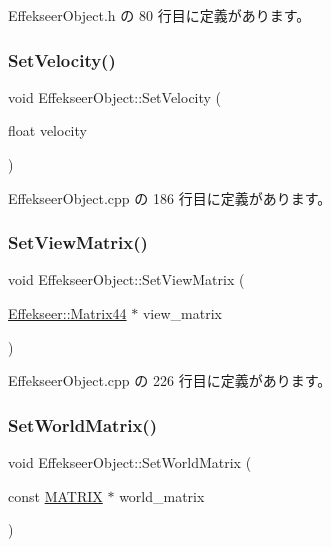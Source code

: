  Effekseer\+Object.\+h の 80 行目に定義があります。

\mbox{\label{class_effekseer_object_a3c14fd4215640b648b14e445b99564f7}} 
\subsubsection{\texorpdfstring{Set\+Velocity()}{SetVelocity()}}
{\footnotesize\ttfamily void Effekseer\+Object\+::\+Set\+Velocity (\begin{DoxyParamCaption}\item[{float}]{velocity }\end{DoxyParamCaption})}



 Effekseer\+Object.\+cpp の 186 行目に定義があります。

\mbox{\label{class_effekseer_object_ac7f3145b79b5e65e45014abd30ee5de8}} 
\subsubsection{\texorpdfstring{Set\+View\+Matrix()}{SetViewMatrix()}}
{\footnotesize\ttfamily void Effekseer\+Object\+::\+Set\+View\+Matrix (\begin{DoxyParamCaption}\item[{\mbox{\hyperlink{struct_effekseer_1_1_matrix44}{Effekseer\+::\+Matrix44}} $\ast$}]{view\+\_\+matrix }\end{DoxyParamCaption})}



 Effekseer\+Object.\+cpp の 226 行目に定義があります。

\mbox{\label{class_effekseer_object_afde70f366e91d31a84ff9b280d4ae3c4}} 
\subsubsection{\texorpdfstring{Set\+World\+Matrix()}{SetWorldMatrix()}}
{\footnotesize\ttfamily void Effekseer\+Object\+::\+Set\+World\+Matrix (\begin{DoxyParamCaption}\item[{const \mbox{\hyperlink{_vector3_d_8h_a032295cd9fb1b711757c90667278e744}{M\+A\+T\+R\+IX}} $\ast$}]{world\+\_\+matrix }\end{DoxyParamCaption})\hspace{0.3cm}{\ttfamily [private]}}



